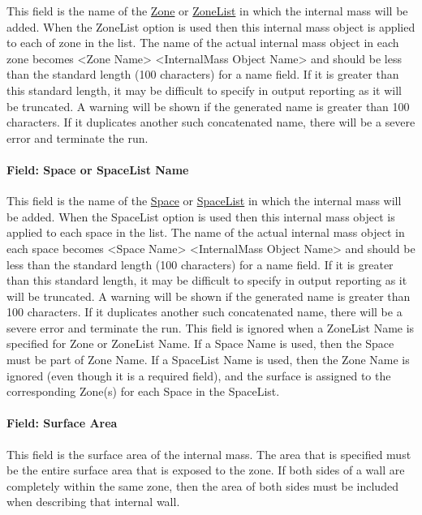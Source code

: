 This field is the name of the \hyperref[zone]{Zone} or \hyperref[zonelist]{ZoneList} in which the internal mass will be added. When the ZoneList option is used then this internal mass object is applied to each of zone in the list. The name of the actual internal mass object in each zone becomes <Zone Name> <InternalMass Object Name> and should be less than the standard length (100 characters) for a name field. If it is greater than this standard length, it may be difficult to specify in output reporting as it will be truncated. A warning will be shown if the generated name is greater than 100 characters. If it duplicates another such concatenated name, there will be a severe error and terminate the run.

\paragraph{Field: Space or SpaceList Name}\label{field-space-or-spacelist-name-14}

This field is the name of the \hyperref[space]{Space} or \hyperref[spacelist]{SpaceList} in which the internal mass will be added. When the SpaceList option is used then this internal mass object is applied to each space in the list. The name of the actual internal mass object in each space becomes <Space Name> <InternalMass Object Name> and should be less than the standard length (100 characters) for a name field. If it is greater than this standard length, it may be difficult to specify in output reporting as it will be truncated. A warning will be shown if the generated name is greater than 100 characters. If it duplicates another such concatenated name, there will be a severe error and terminate the run. This field is ignored when a ZoneList Name is specified for Zone or ZoneList Name. If a Space Name is used, then the Space must be part of Zone Name. If a SpaceList Name is used, then the Zone Name is ignored (even though it is a required field), and the surface is assigned to the corresponding Zone(s) for each Space in the SpaceList.

\paragraph{Field: Surface Area}\label{field-surface-area}

This field is the surface area of the internal mass. The area that is specified must be the entire surface area that is exposed to the zone. If both sides of a wall are completely within the same zone, then the area of both sides must be included when describing that internal wall.

